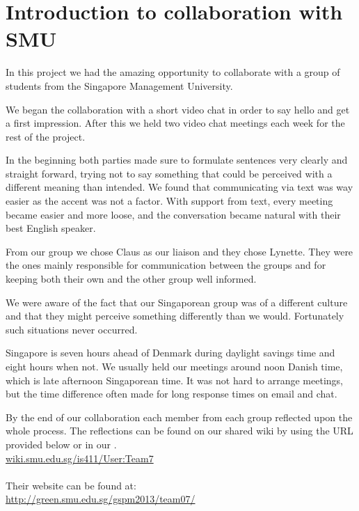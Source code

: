\section{Introduction to collaboration with SMU}
In this project we had the amazing opportunity to collaborate with a group of students from the Singapore Management University.

We began the collaboration with a short video chat in order to say hello and get a first impression. After this we held two video chat meetings each week for the rest of the project.

In the beginning both parties made sure to formulate sentences very clearly and straight forward, trying not to say something that could be perceived with a different meaning than intended. We found that communicating via text was way easier as the accent was not a factor.
With support from text, every  meeting became easier and more loose, and the conversation became natural with their best English speaker.

From our group we chose Claus as our liaison and they chose Lynette. They were the ones mainly responsible for communication between the groups and for keeping both their own and the other group well informed.

We were aware of the fact that our Singaporean group was of a different culture and that they might perceive something differently than we would. Fortunately such situations never occurred.

Singapore is seven hours ahead of Denmark during daylight savings time and eight hours when not. We usually held our meetings around noon Danish time, which is late afternoon Singaporean time. It was not hard to arrange meetings, but the time difference often made for long response times on email and chat.

By the end of our collaboration each member from each group reflected upon the whole process. The reflections can be found on our shared wiki by using the URL provided below or in our .
\\\url{wiki.smu.edu.sg/is411/User:Team7}\\\\

Their website can be found at:
\\\url{http://green.smu.edu.sg/gspm2013/team07/}
\newpage